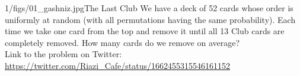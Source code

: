 \begin{problem}{1/figs/01_gashniz.jpg}{The Last Club}
We have a deck of 52 cards whose order is uniformly at random (with all permutations having the same probability).
Each time we take one card from the top and remove it until all 13 Club cards are completely removed. How many cards do we remove on average?\\[0.2cm]

Link to the problem on Twitter:  \url{https://twitter.com/Riazi_Cafe/status/1662455315546161152}\end{problem}